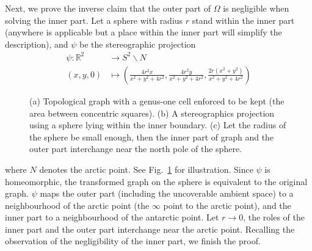 \documentclass[conference]{IEEEtran}
\begin{document}
Next, we prove the inverse claim that the outer part of $\Omega$ is negligible when solving the inner part.  
Let a sphere with radius $r$ stand within the inner part (anywhere is applicable but a place within the inner part will simplify the
 description), and $\psi$ be the stereographic projection%
\begin{equation}
\begin{aligned}
\psi: \mathbb{R}^2&\rightarrow S^2\backslash N\\
(x, y, 0)&\mapsto (\frac{4r^2x}{x^2 + y^2 + 4r^2}, \frac{4r^2y}{x^2 + y^2 + 4r^2}, \frac{2r(x^2 + y^2)}{x^2 + y^2 + 4r^2})
\end{aligned}
\end{equation}
\begin{figure}[t]
\centering
{}
\caption{ (a) Topological graph with a genus-one cell enforced to be kept (the area between concentric squares). 
(b) A stereographics projection using a sphere lying within the inner boundary. 
(c) Let the radius of the sphere be small enough, then the inner part of graph and the outer part interchange 
near the north pole of the sphere. }
\label{fig_stereographic_projection}
\end{figure}
where $N$ denotes the arctic point. See Fig.~\ref{fig_stereographic_projection} for illustration. Since $\psi$ is homeomorphic, 
the transformed graph on the sphere is equivalent to the original graph.  $\psi$ maps the outer part (including the uncoverable ambient 
space) to a neighbourhood of the arctic point (the $\infty$ point to the arctic point), and the inner part to a neighbourhood of the antarctic point. 
Let $r\rightarrow 0$, the roles of the inner part and the outer part interchange near the arctic point. 
Recalling the observation of the negligibility of the inner part, we finish the proof.
\end{document}
